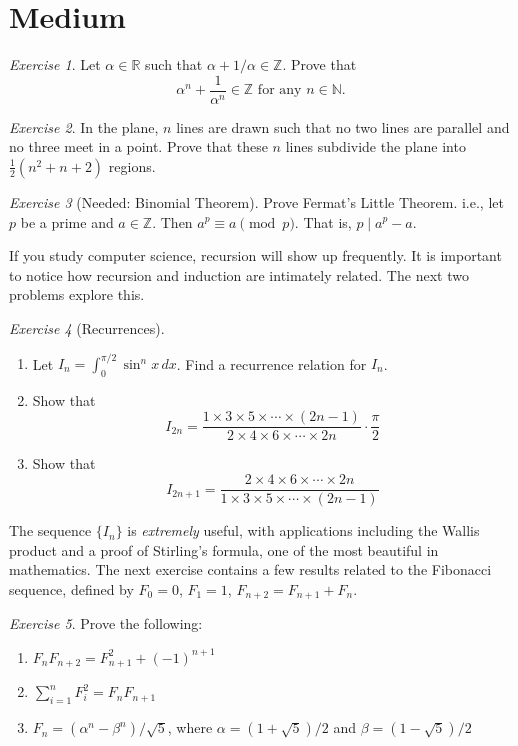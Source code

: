 \documentclass{article}
\theoremstyle{definition}
\theoremstyle{remark}
\newtheorem{exercise}{Exercise}
\newcommand{\NN}{\mathbb{N}}
\newcommand{\ZZ}{\mathbb{Z}}
\begin{document}
\section{Medium}

\begin{exercise}
    Let \(\alpha\in\mathbb R\) such that \(\alpha + 1/\alpha\in\mathbb Z\). Prove that
    \[\alpha^n+\frac{1}{\alpha^n}\in\ZZ \text{ for any }n\in\NN.\]
\end{exercise}

\begin{exercise}
    In the plane, $n$ lines are drawn such that no two lines are parallel and no three meet in a point. Prove that these $n$ lines subdivide the plane into $\frac{1}{2}(n^2+n+2)$ regions.
\end{exercise}

\begin{exercise}[Needed: Binomial Theorem]
    Prove Fermat's Little Theorem. i.e., let \(p\) be a prime and \(a\in\mathbb{Z}\). Then \(a^p\equiv a\pmod p\). That is, \(p\mid a^p-a\).
\end{exercise}

If you study computer science, recursion will show up frequently. It is important to notice how recursion and induction are intimately related. The next two problems explore this.

\begin{exercise}[Recurrences]
    \begin{enumerate}
        \item Let \(I_n=\int_0^{\pi/2}\sin^nx\,dx\). Find a recurrence relation for \(I_n\).
        \item Show that
        \[I_{2n}=\frac{1\times 3\times 5\times\cdots\times(2n-1)}{2\times4\times6\times\cdots\times2n}\cdot\frac{\pi}{2}\]
        \item Show that
        \[I_{2n+1}=\frac{2\times4\times6\times\cdots\times2n}{1\times 3\times 5\times\cdots\times(2n-1)}\]
    \end{enumerate}
\end{exercise}

The sequence $\{I_n\}$ is \emph{extremely} useful, with applications including the Wallis product and a proof of Stirling's formula, one of the most beautiful in mathematics. The next exercise contains a few results related to the Fibonacci sequence, defined by \(F_0=0\), \(F_1=1\), \(F_{n+2}=F_{n+1}+F_n\).

\begin{exercise}
    Prove the following:
    \begin{enumerate}
        \item \(F_nF_{n+2}=F_{n+1}^2+(-1)^{n+1}\)
        \item \(\sum_{i=1}^nF_i^2=F_nF_{n+1}\)
        \item \(F_n=(\alpha^n-\beta^n)/\sqrt5\), where \(\alpha=(1+\sqrt5)/2\) and \(\beta=(1-\sqrt5)/2\)
    \end{enumerate}
\end{exercise}
\end{document}
